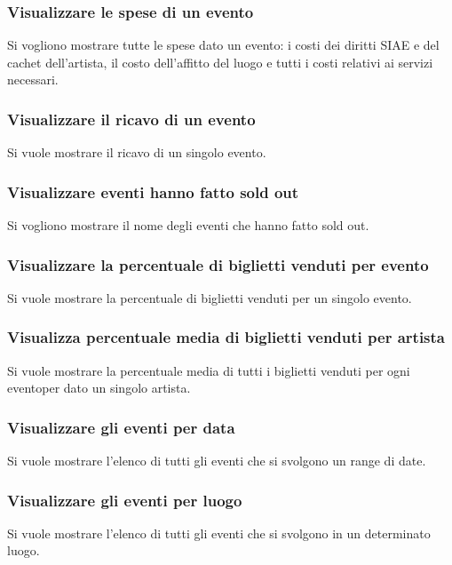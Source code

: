 \documentclass[a4paper,11pt]{article}
\begin{document}
\subsubsection{Visualizzare le spese di un evento}
Si vogliono mostrare tutte le spese dato un evento: i costi dei diritti SIAE e del
cachet dell'artista, il costo dell'affitto del luogo e tutti i costi relativi ai
servizi necessari.


\subsubsection{Visualizzare il ricavo di un evento}
Si vuole mostrare il ricavo di un singolo evento.


\subsubsection{Visualizzare eventi hanno fatto sold out}
Si vogliono mostrare il nome degli eventi che hanno fatto sold out.


\subsubsection{Visualizzare la percentuale di biglietti venduti per evento}
Si vuole mostrare la percentuale di biglietti venduti per un singolo evento.


\subsubsection{Visualizza percentuale media di biglietti venduti per artista}
Si vuole mostrare la percentuale media di tutti i biglietti venduti per ogni
eventoper dato un singolo artista.

 
\subsubsection{Visualizzare gli eventi per data}
Si vuole mostrare l'elenco di tutti gli eventi che si svolgono un range di date.


\subsubsection{Visualizzare gli eventi per luogo}
Si vuole mostrare l'elenco di tutti gli eventi che si svolgono in un determinato luogo.

\end{document}
